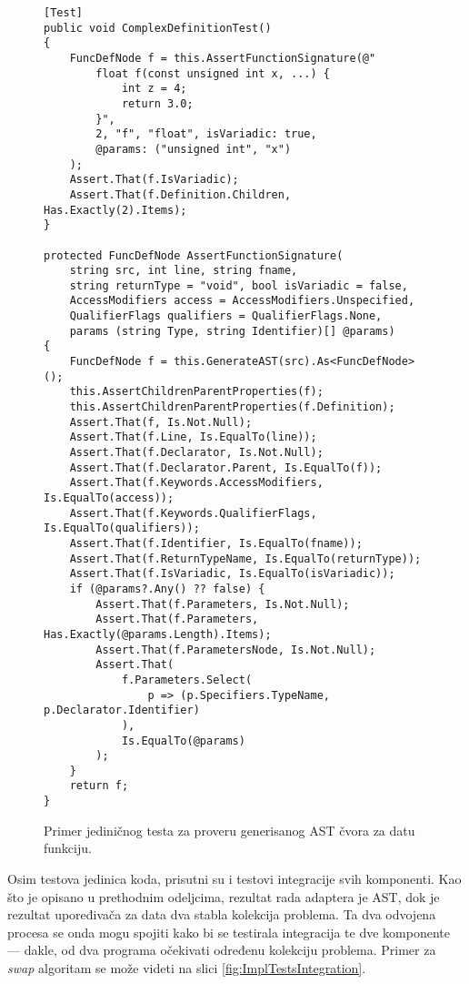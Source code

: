 \begin{figure}[h!]
\centering
\begin{lstlisting}
[Test]
public void ComplexDefinitionTest()
{
    FuncDefNode f = this.AssertFunctionSignature(@"
        float f(const unsigned int x, ...) {
            int z = 4;
            return 3.0;
        }", 
        2, "f", "float", isVariadic: true, 
        @params: ("unsigned int", "x")
    );
    Assert.That(f.IsVariadic);
    Assert.That(f.Definition.Children, Has.Exactly(2).Items);
}

protected FuncDefNode AssertFunctionSignature(
    string src, int line, string fname, 
    string returnType = "void", bool isVariadic = false, 
    AccessModifiers access = AccessModifiers.Unspecified,
    QualifierFlags qualifiers = QualifierFlags.None, 
    params (string Type, string Identifier)[] @params)
{
    FuncDefNode f = this.GenerateAST(src).As<FuncDefNode>();
    this.AssertChildrenParentProperties(f);
    this.AssertChildrenParentProperties(f.Definition);
    Assert.That(f, Is.Not.Null);
    Assert.That(f.Line, Is.EqualTo(line));
    Assert.That(f.Declarator, Is.Not.Null);
    Assert.That(f.Declarator.Parent, Is.EqualTo(f));
    Assert.That(f.Keywords.AccessModifiers, Is.EqualTo(access));
    Assert.That(f.Keywords.QualifierFlags, Is.EqualTo(qualifiers));
    Assert.That(f.Identifier, Is.EqualTo(fname));
    Assert.That(f.ReturnTypeName, Is.EqualTo(returnType));
    Assert.That(f.IsVariadic, Is.EqualTo(isVariadic));
    if (@params?.Any() ?? false) {
        Assert.That(f.Parameters, Is.Not.Null);
        Assert.That(f.Parameters, Has.Exactly(@params.Length).Items);
        Assert.That(f.ParametersNode, Is.Not.Null);
        Assert.That(
            f.Parameters.Select(
                p => (p.Specifiers.TypeName, p.Declarator.Identifier)
            ), 
            Is.EqualTo(@params)
        );
    }
    return f;
}
\end{lstlisting}
\caption{Primer jediničnog testa za proveru generisanog AST čvora za datu funkciju.}
\label{fig:ImplTestsUnit}
\end{figure}

Osim testova jedinica koda, prisutni su i testovi integracije svih komponenti. Kao što je opisano u prethodnim odeljcima, rezultat rada adaptera je AST, dok je rezultat upoređivača za data dva stabla kolekcija problema. Ta dva odvojena procesa se onda mogu spojiti kako bi se testirala integracija te dve komponente --- dakle, od dva programa očekivati određenu kolekciju problema. Primer za \emph{swap} algoritam se može videti na slici \ref{fig:ImplTestsIntegration}.

